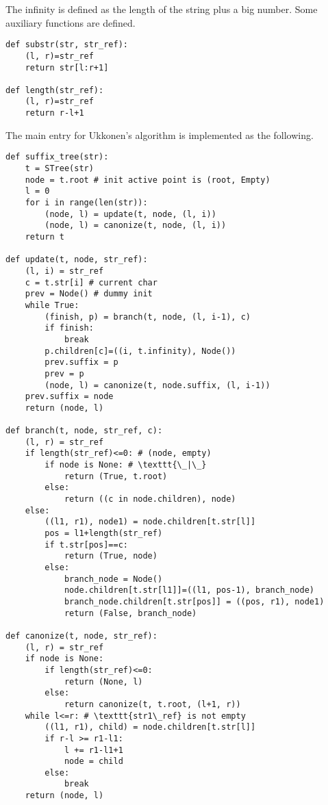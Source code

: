 \documentclass{article}
\begin{document}
The infinity is defined as the length of the string plus a big number.
Some auxiliary functions are defined.

\begin{lstlisting}
def substr(str, str_ref):
    (l, r)=str_ref
    return str[l:r+1]

def length(str_ref):
    (l, r)=str_ref
    return r-l+1
\end{lstlisting}

The main entry for Ukkonen's algorithm is implemented as the following.

\begin{lstlisting}
def suffix_tree(str):
    t = STree(str)
    node = t.root # init active point is (root, Empty)
    l = 0
    for i in range(len(str)):
        (node, l) = update(t, node, (l, i))
        (node, l) = canonize(t, node, (l, i))
    return t

def update(t, node, str_ref):
    (l, i) = str_ref
    c = t.str[i] # current char
    prev = Node() # dummy init
    while True:
        (finish, p) = branch(t, node, (l, i-1), c)
        if finish:
            break
        p.children[c]=((i, t.infinity), Node())
        prev.suffix = p
        prev = p
        (node, l) = canonize(t, node.suffix, (l, i-1))
    prev.suffix = node
    return (node, l)

def branch(t, node, str_ref, c):
    (l, r) = str_ref
    if length(str_ref)<=0: # (node, empty)
        if node is None: # \texttt{\_|\_}
            return (True, t.root)
        else:
            return ((c in node.children), node)
    else:
        ((l1, r1), node1) = node.children[t.str[l]]
        pos = l1+length(str_ref)
        if t.str[pos]==c:
            return (True, node)
        else:
            branch_node = Node()
            node.children[t.str[l1]]=((l1, pos-1), branch_node)
            branch_node.children[t.str[pos]] = ((pos, r1), node1)
            return (False, branch_node)

def canonize(t, node, str_ref):
    (l, r) = str_ref
    if node is None:
        if length(str_ref)<=0:
            return (None, l)
        else:
            return canonize(t, t.root, (l+1, r))
    while l<=r: # \texttt{str1\_ref} is not empty
        ((l1, r1), child) = node.children[t.str[l]]
        if r-l >= r1-l1:
            l += r1-l1+1
            node = child
        else:
            break
    return (node, l)
\end{lstlisting}

\end{document}
